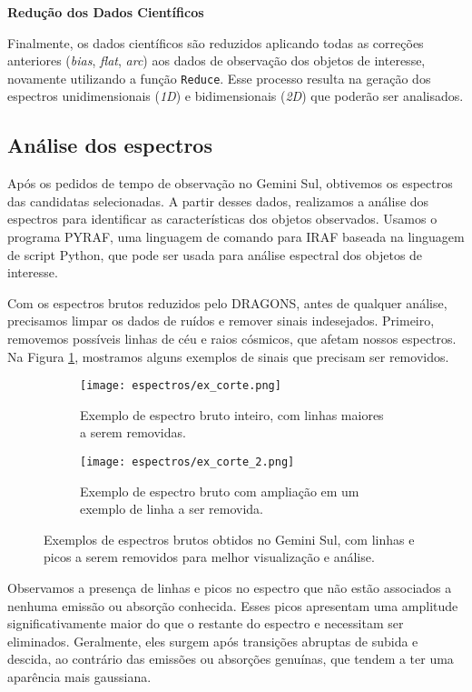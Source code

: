 \textbf{Redução dos Dados Científicos}

Finalmente, os dados científicos são reduzidos aplicando todas as correções anteriores (\textit{bias}, \textit{flat}, \textit{arc}) aos dados de observação dos objetos de interesse, novamente utilizando a função \verb|Reduce|. Esse processo resulta na geração dos espectros unidimensionais (\textit{1D}) e bidimensionais (\textit{2D}) que poderão ser analisados.

\subsection{Análise dos espectros}\label{subsection:analisespectros}
Após os pedidos de tempo de observação no Gemini Sul, obtivemos os espectros das candidatas selecionadas. A partir desses dados, realizamos a análise dos espectros para identificar as características dos objetos observados. Usamos o programa PYRAF, uma linguagem de comando para IRAF baseada na linguagem de script Python, que pode ser usada para análise espectral dos objetos de interesse.

Com os espectros brutos reduzidos pelo DRAGONS, antes de qualquer análise, precisamos limpar os dados de ruídos e remover sinais indesejados. Primeiro, removemos possíveis linhas de céu e raios cósmicos, que afetam nossos espectros. Na Figura \ref{exemplo_remocao_linhas_ceu}, mostramos alguns exemplos de sinais que precisam ser removidos.

\begin{figure}[!ht]
    \centering
    \captionsetup{justification=centering}
    \begin{subfigure}[b]{0.65\textwidth}
        \texttt{[image: espectros/ex\_corte.png]}
        \caption{Exemplo de espectro bruto inteiro, com linhas maiores a serem removidas.}
    \end{subfigure}
    \begin{subfigure}[b]{0.65\textwidth}
        \texttt{[image: espectros/ex\_corte\_2.png]}
        \caption{Exemplo de espectro bruto com ampliação em um exemplo de linha a ser removida.}
    \end{subfigure}
    \caption{Exemplos de espectros brutos obtidos no Gemini Sul, com linhas e picos a serem removidos para melhor visualização e análise.}
    \label{exemplo_remocao_linhas_ceu}
\end{figure}

Observamos a presença de linhas e picos no espectro que não estão associados a nenhuma emissão ou absorção conhecida. Esses picos apresentam uma amplitude significativamente maior do que o restante do espectro e necessitam ser eliminados. Geralmente, eles surgem após transições abruptas de subida e descida, ao contrário das emissões ou absorções genuínas, que tendem a ter uma aparência mais gaussiana.

